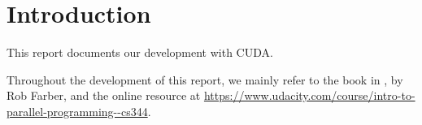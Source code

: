\chapter{Introduction}
\label{chap:introduction}


This report documents our development with CUDA.

Throughout the development of this report, we mainly refer to the book in \cite{farber2011cuda}, by Rob Farber, and the online resource at \url{https://www.udacity.com/course/intro-to-parallel-programming--cs344}.


